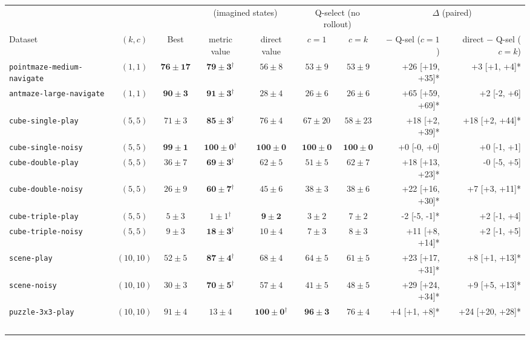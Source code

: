 \begin{tabular}{lcc|cc|cc|rr}
\toprule
 & & & \multicolumn{2}{c|}{\wmpp{} (imagined states)} & \multicolumn{2}{c|}{Q-select (no rollout)} & \multicolumn{2}{c}{$\Delta$ (paired)} \\
\cmidrule(lr){4-5}\cmidrule(lr){6-7}\cmidrule(lr){8-9}
Dataset & $(k,c)$ & Best & metric value & direct value & $c{=}1$ & $c{=}k$ & \wmpp{} $-$ Q-sel ($c{=}1$) & direct $-$ Q-sel ($c{=}k$) \\
\midrule
\texttt{pointmaze-medium-navigate} & $(1,1)$ & $\mathbf{76 \pm 17}$ & $\mathbf{79 \pm 3}$$^{\dagger}$ & $56 \pm 8$ & $53 \pm 9$ & $53 \pm 9$ & +26 [+19, +35]* & +3 [+1, +4]* \\
\texttt{antmaze-large-navigate} & $(1,1)$ & $\mathbf{90 \pm 3}$ & $\mathbf{91 \pm 3}$$^{\dagger}$ & $28 \pm 4$ & $26 \pm 6$ & $26 \pm 6$ & +65 [+59, +69]* & +2 [-2, +6] \\
\midrule
\texttt{cube-single-play} & $(5,5)$ & $71 \pm 3$ & $\mathbf{85 \pm 3}$$^{\dagger}$ & $76 \pm 4$ & $67 \pm 20$ & $58 \pm 23$ & +18 [+2, +39]* & +18 [+2, +44]* \\
\texttt{cube-single-noisy} & $(5,5)$ & $\mathbf{99 \pm 1}$ & $\mathbf{100 \pm 0}$$^{\dagger}$ & $\mathbf{100 \pm 0}$ & $\mathbf{100 \pm 0}$ & $\mathbf{100 \pm 0}$ & +0 [-0, +0] & +0 [-1, +1] \\
\texttt{cube-double-play} & $(5,5)$ & $36 \pm 7$ & $\mathbf{69 \pm 3}$$^{\dagger}$ & $62 \pm 5$ & $51 \pm 5$ & $62 \pm 7$ & +18 [+13, +23]* & -0 [-5, +5] \\
\texttt{cube-double-noisy} & $(5,5)$ & $26 \pm 9$ & $\mathbf{60 \pm 7}$$^{\dagger}$ & $45 \pm 6$ & $38 \pm 3$ & $38 \pm 6$ & +22 [+16, +30]* & +7 [+3, +11]* \\
\texttt{cube-triple-play} & $(5,5)$ & $5 \pm 3$ & $1 \pm 1$$^{\dagger}$ & $\mathbf{9 \pm 2}$ & $3 \pm 2$ & $7 \pm 2$ & -2 [-5, -1]* & +2 [-1, +4] \\
\texttt{cube-triple-noisy} & $(5,5)$ & $9 \pm 3$ & $\mathbf{18 \pm 3}$$^{\dagger}$ & $10 \pm 4$ & $7 \pm 3$ & $8 \pm 3$ & +11 [+8, +14]* & +2 [-1, +5] \\
\midrule
\texttt{scene-play} & $(10,10)$ & $52 \pm 5$ & $\mathbf{87 \pm 4}$$^{\dagger}$ & $68 \pm 4$ & $64 \pm 5$ & $61 \pm 5$ & +23 [+17, +31]* & +8 [+1, +13]* \\
\texttt{scene-noisy} & $(10,10)$ & $30 \pm 3$ & $\mathbf{70 \pm 5}$$^{\dagger}$ & $57 \pm 4$ & $41 \pm 5$ & $48 \pm 5$ & +29 [+24, +34]* & +9 [+5, +13]* \\
\midrule
\texttt{puzzle-3x3-play} & $(10,10)$ & $91 \pm 4$ & $13 \pm 4$ & $\mathbf{100 \pm 0}$$^{\dagger}$ & $\mathbf{96 \pm 3}$ & $76 \pm 4$ & +4 [+1, +8]* & +24 [+20, +28]* \\
$$
\end{tabular}
